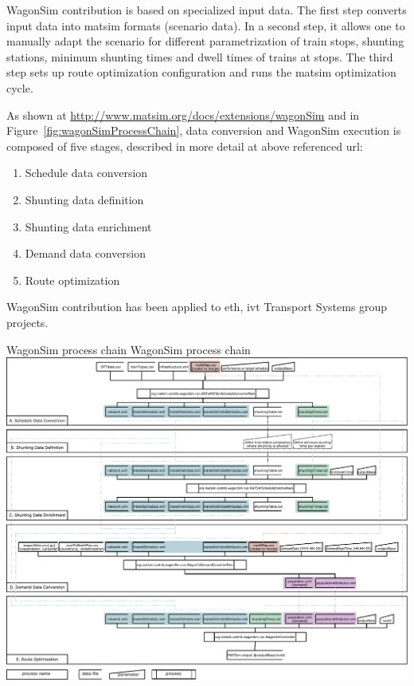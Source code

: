 WagonSim \gls{contribution} is based on specialized input data. 
The first step converts input data into \gls{matsim} formats (scenario data). In a second step, it allows one to manually adapt the scenario for different parametrization of train stops, shunting stations, minimum shunting times and dwell times of trains at stops. 
The third step sets up route optimization configuration and runs the \gls{matsim} optimization cycle.

As shown at \url{http://www.matsim.org/docs/extensions/wagonSim} and in Figure~\ref{fig:wagonSimProcessChain}, data conversion and WagonSim execution is composed of five stages, described in more detail at above referenced url:
%
\begin{enumerate}[label=\emph{\Alph*})]
\item Schedule data conversion
\item Shunting data definition
\item Shunting data enrichment
\item Demand data conversion
\item Route optimization
\end{enumerate}
%
WagonSim \gls{contribution} has been applied to \gls{eth}, \gls{ivt} Transport Systems group projects.

\createfigure%
{WagonSim process chain}%
{WagonSim process chain}%
{\label{fig:wagonSimProcessChain}}%
{\includegraphics[width=1.22\textwidth,angle=90]{extending/figures/wagonsim/processChainsCompact}}%
{}

